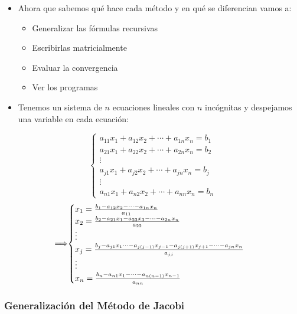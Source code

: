 \documentclass[]{book}
\providecommand{\tightlist}{%
  \setlength{\itemsep}{0pt}\setlength{\parskip}{0pt}}
\begin{document}
\begin{itemize}
\item
  Ahora que sabemos qué hace cada método y en qué se diferencian vamos a:

  \begin{itemize}
  \tightlist
  \item
    Generalizar las fórmulas recursivas
  \item
    Escribirlas matricialmente
  \item
    Evaluar la convergencia
  \item
    Ver los programas
  \end{itemize}
\item
  Tenemos un sistema de \(n\) ecuaciones lineales con \(n\) incógnitas y despejamos una variable en cada ecuación:
\end{itemize}

\[
\begin{cases} 
a_{11}x_1 + a_{12}x_2 + \cdots + a_{1n}x_n = b_1 \\
a_{21}x_1 + a_{22}x_2 + \cdots + a_{2n}x_n = b_2 \\
\vdots \\
a_{j1}x_1 + a_{j2}x_2 + \cdots + a_{jn}x_n = b_j \\
\vdots \\
a_{n1}x_1 + a_{n2}x_2 + \cdots + a_{nn}x_n = b_n
\end{cases}
\]
\[
\implies\hspace{-0.2cm}
\begin{cases} 
x_1 = \frac{b_1 - a_{12}x_2 - \cdots - a_{1n}x_n}{ a_{11}}\\
x_2 = \frac{b_2 - a_{21}x_1 - a_{23}x_3 - \cdots - a_{2n}x_n}{ a_{22}}\\
\vdots \\
x_j = \frac{b_j - a_{j1}x_1 \cdots - a_{j(j-1)}x_{j-1} - a_{j(j+1)}x_{j+1} - \cdots - a_{jn}x_n}{ a_{jj}}\\
\vdots \\
x_n = \frac{b_n - a_{n1}x_1 - \cdots - a_{n(n-1)}x_{n-1}}{a_{nn}}\\
\end{cases}
\]

\hypertarget{generalizaciuxf3n-del-muxe9todo-de-jacobi}{%
\subsubsection{Generalización del Método de Jacobi}\label{generalizaciuxf3n-del-muxe9todo-de-jacobi}}
\end{document}
